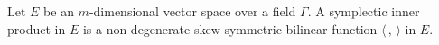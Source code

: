 Let $E$ be an $m$-dimensional vector space over a field $\Gamma$. A symplectic inner product in $E$ is a non-degenerate skew symmetric bilinear function $\langle\, , \,\rangle$ in $E$.
